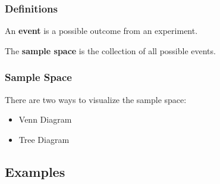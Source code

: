 \begin{frame}
  \frametitle{Definitions}

  \begin{definition}
    An \textbf{event} is a possible outcome from an experiment.
  \end{definition}

  \begin{definition}
    The \textbf{sample space} is the collection of all possible
    events.
  \end{definition}

\end{frame}


\begin{frame}
  \frametitle{Sample Space}

  There are two ways to visualize the sample space:
  \begin{itemize}
  \item Venn Diagram
  \item Tree Diagram
  \end{itemize}

\end{frame}

\subsection{Examples}

